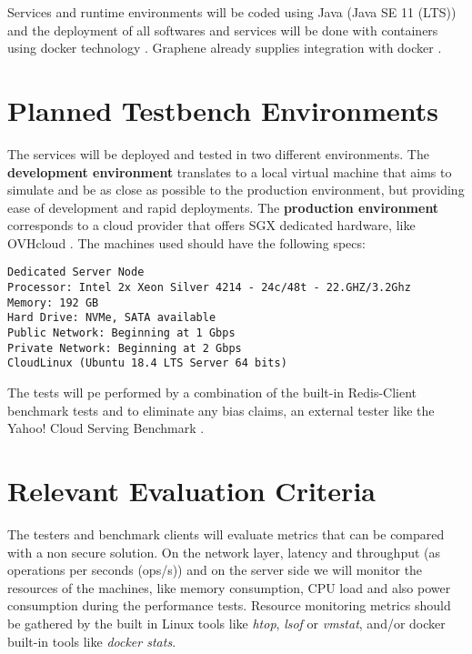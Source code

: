 Services and runtime environments will be coded using Java (Java SE 11 (LTS)) and the deployment of all softwares and services will be done with containers using docker technology \cite{docker:1}. Graphene already supplies integration with docker \cite{graphene_container:1}.

\section{Planned Testbench Environments} %
\label{sec:planned_testbench_environments}

The services will be deployed and tested in two different environments. The \textbf{development environment} translates to a local virtual machine that aims to simulate and be as close as possible to the production environment, but providing ease of development and rapid deployments. The \textbf{production environment} corresponds to a cloud provider that offers \gls{SGX} dedicated hardware, like OVHcloud \cite{ovhcloud:1}. The machines used should have the following specs:

\lstset{numbers=none, caption=Machine Specifications, label=lst:machine_specs}
\begin{lstlisting}
Dedicated Server Node
Processor: Intel 2x Xeon Silver 4214 - 24c/48t - 22.GHZ/3.2Ghz
Memory: 192 GB
Hard Drive: NVMe, SATA available
Public Network: Beginning at 1 Gbps
Private Network: Beginning at 2 Gbps
CloudLinux (Ubuntu 18.4 LTS Server 64 bits)
\end{lstlisting}

The tests will pe performed by a combination of the built-in Redis-Client benchmark tests \cite{redis_benchmark_cli:1} and to eliminate any bias claims, an external tester like the Yahoo! Cloud Serving Benchmark \cite{yahoo_benchmark:1}.

\section{Relevant Evaluation Criteria} %
\label{sec:relevant_evaluation_criteria}

The testers and benchmark clients will evaluate metrics that can be compared with a non secure solution. On the network layer, latency and throughput (as operations per seconds (ops/s)) and on the server side we will monitor the resources of the machines, like memory consumption, CPU load and also power consumption during the performance tests. Resource monitoring metrics should be gathered by the built in Linux tools like \textit{htop}, \textit{lsof} or \textit{vmstat}, and/or docker built-in tools like \textit{docker stats}.